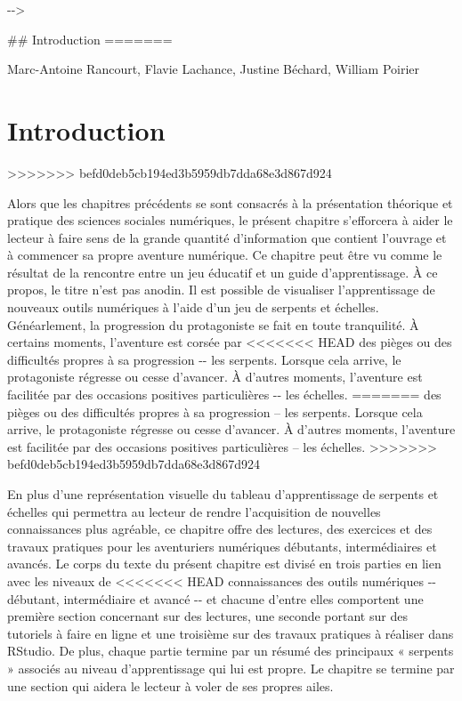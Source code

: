 \documentclass[
  letterpaper,
]{scrbook}
\begin{document}
-\/-\textgreater{}

\#\# Introduction
=======
\begin{center}

Marc-Antoine Rancourt, Flavie Lachance, Justine Béchard, William Poirier

\end{center}

\hypertarget{introduction-2}{%
\section{Introduction}\label{introduction-2}}
>>>>>>> befd0deb5cb194ed3b5959db7dda68e3d867d924

Alors que les chapitres précédents se sont consacrés à la présentation
théorique et pratique des sciences sociales numériques, le présent
chapitre s'efforcera à aider le lecteur à faire sens de la grande
quantité d'information que contient l'ouvrage et à commencer sa propre
aventure numérique. Ce chapitre peut être vu comme le résultat de la
rencontre entre un jeu éducatif et un guide d'apprentissage. À ce
propos, le titre n'est pas anodin. Il est possible de visualiser
l'apprentissage de nouveaux outils numériques à l'aide d'un jeu de
serpents et échelles. Généarlement, la progression du protagoniste se
fait en toute tranquilité. À certains moments, l'aventure est corsée par
<<<<<<< HEAD
des pièges ou des difficultés propres à sa progression -\/- les
serpents. Lorsque cela arrive, le protagoniste régresse ou cesse
d'avancer. À d'autres moments, l'aventure est facilitée par des
occasions positives particulières -\/- les échelles.
=======
des pièges ou des difficultés propres à sa progression -- les serpents.
Lorsque cela arrive, le protagoniste régresse ou cesse d'avancer. À
d'autres moments, l'aventure est facilitée par des occasions positives
particulières -- les échelles.
>>>>>>> befd0deb5cb194ed3b5959db7dda68e3d867d924

En plus d'une représentation visuelle du tableau d'apprentissage de
serpents et échelles qui permettra au lecteur de rendre l'acquisition de
nouvelles connaissances plus agréable, ce chapitre offre des lectures,
des exercices et des travaux pratiques pour les aventuriers numériques
débutants, intermédiaires et avancés. Le corps du texte du présent
chapitre est divisé en trois parties en lien avec les niveaux de
<<<<<<< HEAD
connaissances des outils numériques -\/- débutant, intermédiaire et
avancé -\/- et chacune d'entre elles comportent une première section
concernant sur des lectures, une seconde portant sur des tutoriels à
faire en ligne et une troisième sur des travaux pratiques à réaliser
dans RStudio. De plus, chaque partie termine par un résumé des
principaux « serpents » associés au niveau d'apprentissage qui lui est
propre. Le chapitre se termine par une section qui aidera le lecteur à
voler de ses propres ailes.
\end{document}
